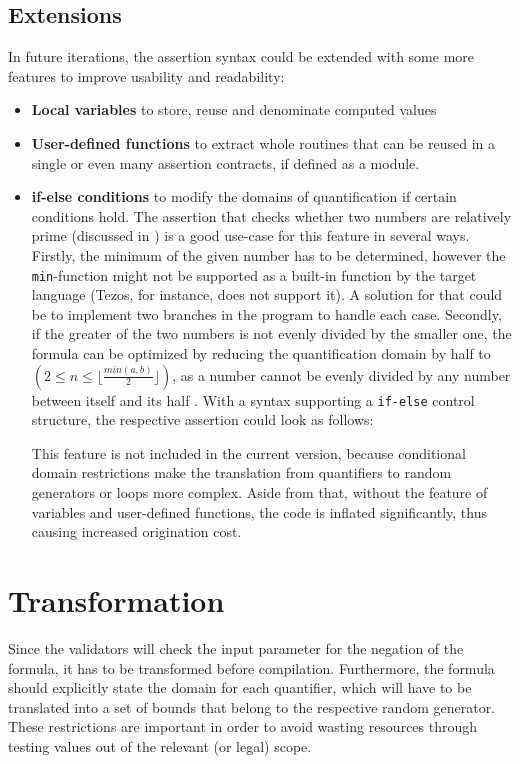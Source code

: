 \subsection{Extensions}
In future iterations, the assertion syntax could be extended with some more features to improve usability and readability:
\begin{itemize}
\item \textbf{Local variables} to store, reuse and denominate computed values
\item \textbf{User-defined functions} to extract whole routines that can be reused in a single or even many assertion contracts, if defined as a module.
\item \textbf{if-else conditions} to modify the domains of quantification if certain conditions hold. The assertion that checks whether two numbers are relatively prime (discussed in ) is a good use-case for this feature in several ways. Firstly, the minimum of the given number has to be determined, however the \texttt{min}-function might not be supported as a built-in function by the target language (Tezos, for instance, does not support it). A solution for that could be to implement two branches in the program to handle each case. Secondly, if the greater of the two numbers is not evenly divided by the smaller one, the formula can be optimized by reducing the quantification domain by half to $(2 \le n \le \lfloor \frac{min(a,b)}{2} \rfloor)$, as a number cannot be evenly divided by any number between itself and its half \cite{bernhardt_veigel_2020}. With a syntax supporting a \texttt{if-else} control structure, the respective assertion could look as follows:

This feature is not included in the current version, because conditional domain restrictions make the translation from quantifiers to random generators or loops more complex. Aside from that, without the feature of variables and user-defined functions, the code is inflated significantly, thus causing increased origination cost.
\end{itemize}

\section{Transformation}\label{sec:transformation}
Since the validators will check the input parameter for the negation of the formula, it has to be transformed before compilation. Furthermore, the formula should explicitly state the domain for each quantifier, which will have to be translated into a set of bounds that belong to the respective random generator. These restrictions are important in order to avoid wasting resources through testing values out of the relevant (or legal) scope.

